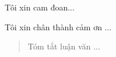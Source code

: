 \documentclass[12pt,a4paper,oneside]{book} %
\begin{document}

\coverpage

\frontmatter

\begin{declaration}
	Tôi xin cam đoan...
\end{declaration}

\begin{acknowledgments}
	Tôi xin chân thành cảm ơn ...
\end{acknowledgments}

\begin{abstract}
	Tóm tắt luận văn ...
\end{abstract}	
	
\tableofcontents
\listoftables
\listoffigures


\mainmatter

\fancyhead{}  %
\renewcommand{\footrulewidth}{0.4pt}

\pagestyle{fancy}  %


%
%

\end{document}
